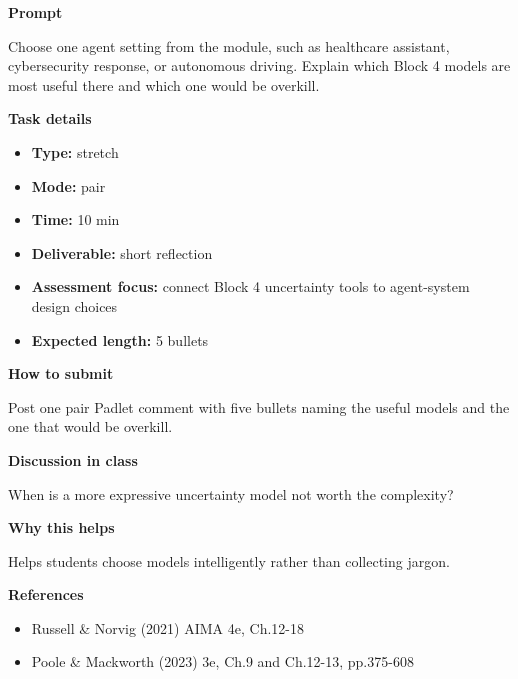 \documentclass[11pt]{article}
\begin{document}
\begin{tcolorbox}[colback=white,colframe=MidnightBlue,title={Q8 Stretch Cross-Block Reflection},fonttitle=\bfseries,breakable]
\begin{center}
\end{center}

{\large\bfseries\color{MidnightBlue} Prompt}\par\medskip
Choose one agent setting from the module, such as healthcare assistant, cybersecurity response, or autonomous driving. Explain which Block 4 models are most useful there and which one would be overkill.

{\large\bfseries\color{MidnightBlue} Task details}\par\medskip
\begin{itemize}\item \textbf{Type:} stretch
\item \textbf{Mode:} pair
\item \textbf{Time:} 10 min
\item \textbf{Deliverable:} short reflection
\item \textbf{Assessment focus:} connect Block 4 uncertainty tools to agent-system design choices
\item \textbf{Expected length:} 5 bullets\end{itemize}

{\large\bfseries\color{MidnightBlue} How to submit}\par\medskip
Post one pair Padlet comment with five bullets naming the useful models and the one that would be overkill.

{\large\bfseries\color{MidnightBlue} Discussion in class}\par\medskip
When is a more expressive uncertainty model not worth the complexity?

{\large\bfseries\color{MidnightBlue} Why this helps}\par\medskip
Helps students choose models intelligently rather than collecting jargon.

{\large\bfseries\color{MidnightBlue} References}\par\medskip
\begin{itemize}\item Russell \& Norvig (2021) AIMA 4e, Ch.12-18
\item Poole \& Mackworth (2023) 3e, Ch.9 and Ch.12-13, pp.375-608\end{itemize}
\end{tcolorbox}
\end{document}
